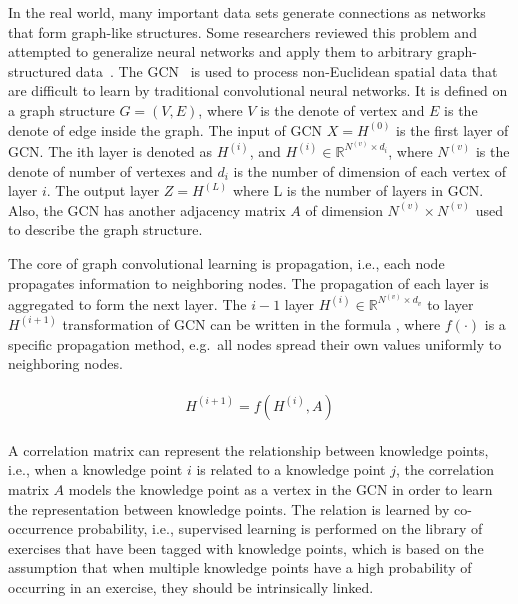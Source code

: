 In the real world, many important data sets generate connections as networks that form graph-like structures. Some researchers reviewed this problem and attempted to generalize neural networks and apply them to arbitrary graph-structured data~\cite{wu2018socialgcn, dettmers2018convolutional}. The GCN~\cite{kipf2017semi} is used to process non-Euclidean spatial data that are difficult to learn by traditional convolutional neural networks. It is defined on a graph structure \(G=(V, E)\), where \(V\) is the denote of vertex and \(E\) is the denote of edge inside the graph. The input of GCN \(X = H^{(0)}\) is the first layer of GCN. The ith layer is denoted as \(H^{(i)}\), and \(H^{(i)}\in \mathbb{R}^{N^{(v)}\times d_{i}}\), where \(N^{(v)}\) is the denote of number of vertexes and \(d_{i}\) is the number of dimension of each vertex of layer \(i\). The output layer \(Z = H^{(L)}\) where L is the number of layers in GCN\@. Also, the GCN has another adjacency matrix \(A\) of dimension \(N^{(v)}\times N^{(v)}\) used to describe the graph structure.

The core of graph convolutional learning is propagation, i.e., each node propagates information to neighboring nodes. The propagation of each layer is aggregated to form the next layer. The \(i-1\) layer \(H^{(i)}\in \mathbb{R}^{N^{(v)}\times d_v}\) to layer \(H^{(i+1)}\) transformation of GCN can be written in the formula \eqname{\ref{fml:ch2-gcnlayer}}, where \(f(\cdot)\) is a specific propagation method, e.g.\ all nodes spread their own values uniformly to neighboring nodes.

\begin{align}
    \begin{split}
        H^{(i+1)}=f(H^{(i)},A) \label{fml:ch2-gcnlayer}
    \end{split}
\end{align}


A correlation matrix can represent the relationship between knowledge points, i.e., when a knowledge point \(i\) is related to a knowledge point \(j\), the correlation matrix \(A\) models the knowledge point as a vertex in the GCN in order to learn the representation between knowledge points. The relation is learned by co-occurrence probability, i.e., supervised learning is performed on the library of exercises that have been tagged with knowledge points, which is based on the assumption that when multiple knowledge points have a high probability of occurring in an exercise, they should be intrinsically linked.

